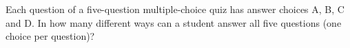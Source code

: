 Each question of a five-question multiple-choice quiz has answer choices A, B, C and D. In how many different ways can a student answer all five questions (one choice per question)?
